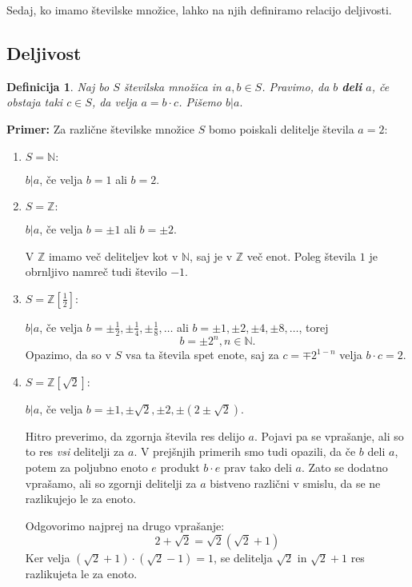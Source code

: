 \documentclass[12pt, a4paper]{article}
\newtheorem{defi}{Definicija}
\newenvironment{prim}[1][]{\par\medskip\noindent \textbf{Primer: }}{\medskip}
\begin{document}
Sedaj, ko imamo številske množice, lahko na njih definiramo relacijo deljivosti.

\subsection{Deljivost}

\begin{defi}
Naj bo $S$ številska množica in $a,b \in S$. Pravimo, da $b$ \textbf{deli} $a$, če obstaja taki $c \in S$, da velja $a=b\cdot c$. Pišemo $ b|a.$
\end{defi}

\begin{prim}
Za različne številske množice $S$ bomo poiskali delitelje števila $a=2$:
\begin{enumerate}

\item $S=\mathbb{N}:$

$b|a$, če velja $b=1$ ali $b=2$.

\item $S=\mathbb{Z}:$

$b|a$, če velja $b=\pm 1$ ali $b=\pm 2$.

V $\mathbb{Z}$ imamo več deliteljev kot v $\mathbb{N}$, saj je v $\mathbb{Z}$ več enot. Poleg števila $1$ je obrnljivo namreč tudi število $-1$.

\item $S=\mathbb{Z}[\frac{1}{2}]:$

$b|a$, če velja $b=\pm \frac{1}{2}, \pm \frac{1}{4}, \pm \frac{1}{8},\dots$ ali  $b=\pm 1, \pm 2, \pm4, \pm 8, \dots$, torej $$b=\pm 2^{n}, n \in \mathbb{N}.$$ Opazimo, da so v $S$ vsa ta števila spet enote, saj za $c=\mp 2^{1-n}$ velja $b\cdot c = 2$.

\item $S=\mathbb{Z}[\sqrt{2}]:$

$b|a$, če velja $b=\pm1, \pm \sqrt{2}, \pm 2, \pm(2\pm\sqrt{2})$.

Hitro preverimo, da zgornja števila res delijo $a$. Pojavi pa se vprašanje, ali so to res \textit{vsi} delitelji za $a$. V prejšnjih primerih smo tudi opazili, da če $b$ deli $a$, potem za poljubno enoto $e$ produkt $b\cdot e$ prav tako deli $a$. Zato se dodatno vprašamo, ali so zgornji delitelji za $a$ bistveno različni v smislu, da se ne razlikujejo le za enoto. 

Odgovorimo najprej na drugo vprašanje:
$$ 2 + \sqrt{2} = \sqrt{2}(\sqrt{2} + 1)$$
Ker velja $(\sqrt{2} + 1)\cdot (\sqrt{2} - 1) = 1 $, se delitelja $\sqrt{2}$ in $\sqrt{2} + 1$ res razlikujeta le za enoto.


\end{enumerate}
\end{prim}
\end{document}
